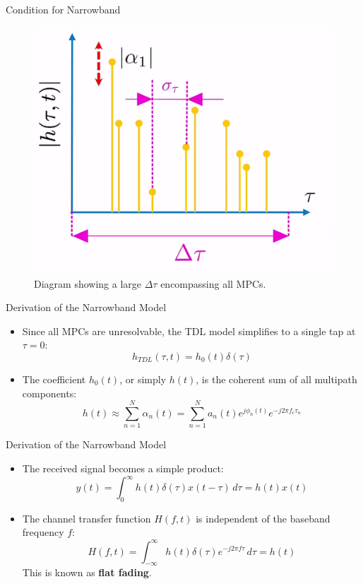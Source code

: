 \documentclass{beamer}
\begin{document}
	\begin{frame}{Condition for Narrowband}
		\begin{figure}
			\centering
			\includegraphics[width=0.6\linewidth]{pictures/narrowband-condition}
			\caption{Diagram showing a large $\Delta\tau$ encompassing all MPCs.}
		\end{figure}
	\end{frame}
	
	\begin{frame}{Derivation of the Narrowband Model}
		\begin{itemize}
			\item Since all MPCs are unresolvable, the TDL model simplifies to a single tap at $\tau=0$:
			\[ h_{TDL}(\tau, t) = h_0(t) \delta(\tau) \]
			
			\item The coefficient $h_0(t)$, or simply $h(t)$, is the coherent sum of all multipath components:
			\[ h(t) \approx \sum_{n=1}^{N} \alpha_n(t) = \sum_{n=1}^{N} a_n(t) e^{j\phi_n(t)} e^{-j2\pi f_c \tau_n} \]
		\end{itemize}
	\end{frame}
	
	\begin{frame}{Derivation of the Narrowband Model}
		\begin{itemize}
			\item The received signal becomes a simple product:
			\[ y(t) = \int_0^{\infty} h(t)\delta(\tau) x(t - \tau) \, d\tau = h(t)x(t) \]
			
			\item The channel transfer function $H(f,t)$ is independent of the baseband frequency $f$:
			\[ H(f,t) = \int_{-\infty}^{\infty} h(t)\delta(\tau) e^{-j2\pi f \tau} \, d\tau = h(t) \]
			This is known as \textbf{flat fading}.
		\end{itemize}
	\end{frame}
	
\end{document}
